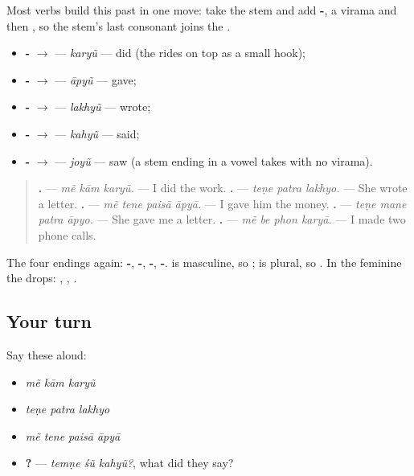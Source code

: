 \begin{grammarlens}[title={Grammar Lens: -\gu{્યું} on the stem}]
Most verbs build this past in one move: take the stem and add \textbf{-}, a virama and then \textbf{}, so the stem's last consonant joins the \textbf{}.

\begin{itemize}
\raggedright
  \item \textbf{-} $\to$ \textbf{} — \emph{karyũ} — did (the \textbf{} rides on top as a small hook);
  \item \textbf{-} $\to$ \textbf{} — \emph{āpyũ} — gave;
  \item \textbf{-} $\to$ \textbf{} — \emph{lakhyũ} — wrote;
  \item \textbf{-} $\to$ \textbf{} — \emph{kahyũ} — said;
  \item \textbf{-} $\to$ \textbf{} — \emph{joyũ} — saw (a stem ending in a vowel takes \textbf{} with no virama).
\end{itemize}

\begin{quote}
\textbf{  .} — \emph{mẽ kām karyũ.} — I did the work. \textbf{  .} — \emph{teṇe patra lakhyo.} — She wrote a letter. \textbf{   .} — \emph{mẽ tene paisā āpyā.} — I gave him the money. \textbf{   .} — \emph{teṇe mane patra āpyo.} — She gave me a letter. \textbf{   .} — \emph{mẽ be phon karyā.} — I made two phone calls.
\end{quote}

The four endings again: \textbf{-}, \textbf{-}, \textbf{-}, \textbf{-}. \textbf{} is masculine, so \textbf{}; \textbf{} is plural, so \textbf{}. In the feminine the \textbf{} drops: \textbf{}, \textbf{}, \textbf{}.
\end{grammarlens}

\subsection*{Your turn}
Say these aloud:

\begin{itemize}
\raggedright
  \item \emph{mẽ kām karyũ}
  \item \emph{teṇe patra lakhyo}
  \item \emph{mẽ tene paisā āpyā}
  \item \textbf{  ?} — \emph{temṇe śũ kahyũ?}, what did they say?
\end{itemize}

